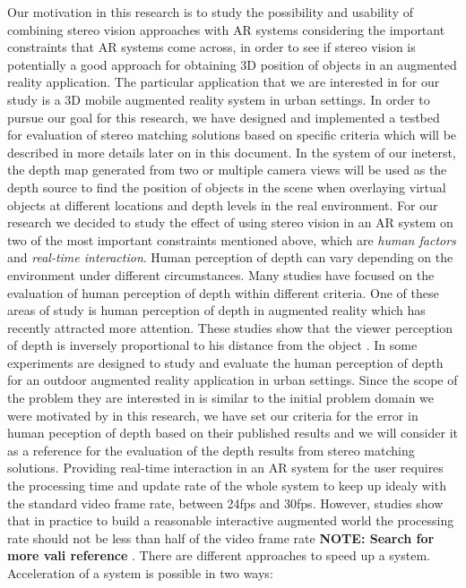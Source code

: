 \documentclass[dvips,letterpaper,12pt]{report}
\begin{document}
Our motivation in this research is to study the possibility and usability of combining stereo vision approaches with AR systems considering the important constraints that AR systems come across, 
in order to see if stereo vision 
is potentially a good approach for obtaining 3D position of objects in an augmented reality application. The particular application that we are interested in for
our study is a 3D mobile augmented reality system in urban settings. In order to pursue our goal for this research, we have designed and implemented a testbed for evaluation of
stereo matching solutions based on specific criteria which will be described in more details later on in this document.
In the system of our ineterst, the depth map generated from two or multiple camera views will be used as the depth source to find the position of objects in the scene when
overlaying virtual objects at different locations and depth levels in the real environment. For our research we decided to study the effect of using stereo vision in an AR 
system on two of the most important constraints mentioned above, which are {\it human factors} and {\it real-time interaction}. {\newline}
Human perception of depth can vary depending on the environment under different circumstances. Many studies have focused on the evaluation of human perception of depth within different
criteria. One of these areas of study is human perception of depth in augmented reality which has recently attracted more attention. These studies show that the viewer perception of depth
is inversely proportional to his distance from the object \cite{kru10,swa07,jer05,liv05}. In \cite{swa07} some experiments are designed to study and evaluate the human
perception of depth for an outdoor augmented reality application in urban settings. Since the scope of the problem they are interested in is similar to the initial problem domain we 
were motivated by in this research, we have set our criteria for the error in human peception of depth based on their published results and we will consider it as a reference for the 
evaluation of the depth results from stereo matching solutions. \newline
Providing real-time interaction in an AR system for the user requires the processing time and update rate of the whole system to keep up idealy with the standard video frame rate, between 24fps and 
30fps. However, studies show that in practice to build a reasonable interactive augmented world the processing rate should not be less than half of the video frame rate {\bf NOTE: Search for more vali
reference} \cite{spe}. There are different approaches to speed up a system. Acceleration of a system is possible in two ways:
\end{document}
